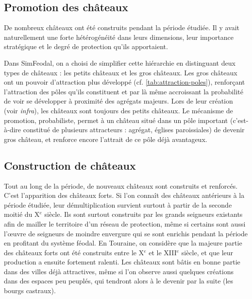 \subsection{Promotion des châteaux}

De nombreux châteaux ont été construits pendant la période étudiée.
Il y avait naturellement une forte hétérogénéité dans leurs dimensions, leur importance stratégique et le degré de protection qu'ils apportaient.


\begin{tcolorbox}[breakable,left=0pt,right=0pt,top=0pt,bottom=0pt,
	colback=gray!15,colframe=gray!15,width=\dimexpr\textwidth\relax, 
	enlarge left by=0mm, boxsep=5pt,arc=0pt,outer arc=0pt]
	Dans SimFeodal, on a choisi de simplifier cette hiérarchie en distinguant deux types de châteaux : les \og petits châteaux\fg{} et les \og gros châteaux\fg{}.
	Les gros châteaux ont un pouvoir d'attraction plus développé (cf. \cref{tab:attraction-poles}), renforçant l'attraction des pôles qu'ils constituent et par là même accroissant la probabilité de voir se développer à proximité des agrégats majeurs.
	Lors de leur création (voir \textit{infra}), les châteaux sont toujours des \og petits châteaux\fg{}.
	Le mécanisme de promotion, probabiliste, permet à un château situé dans un pôle important (c'est-à-dire constitué de plusieurs attracteurs : agrégat, églises paroissiales) de devenir \og gros château\fg{}, et renforce encore l'attrait de ce pôle déjà avantageux.
\end{tcolorbox}

\subsection{Construction de châteaux}

Tout au long de la période, de nouveaux châteaux sont construits et renforcés. C'est l'apparition des \og châteaux forts\fg{}.
Si l'on connaît des châteaux antérieurs à la période étudiée, leur démultiplication survient surtout à partir de la seconde moitié du X$^e$ siècle.
Ils sont surtout construits par les grands seigneurs existants afin de mailler le territoire d'un réseau de protection, même si certains sont aussi l'œuvre de seigneurs de moindre envergure qui se sont enrichis pendant la période en profitant du système féodal.
En Touraine, on considère que la majeure partie des châteaux forts ont été construits entre le X$^e$ et le XIII$^e$ siècle, et que leur production a ensuite fortement ralenti.
Les châteaux sont bâtis en bonne partie dans des villes déjà attractives, même si l'on observe aussi quelques créations dans des espaces peu peuplés, qui tendront alors à le devenir par la suite (les bourgs castraux).

